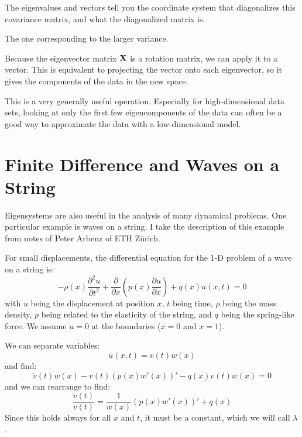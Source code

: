 
The eigenvalues and vectors tell you the coordinate system that
diagonalizes this covariance matrix, and what the diagonalized matrix
is.


\begin{answer}
The one corresponding to the larger variance.
\end{answer}

Because the eigenvector matrix ${\bf X}$ is a rotation matrix, we can
apply it to a vector.  This is equivalent to projecting the vector
onto each eigenvector, so it gives the components of the data in the
new space.

This is a very generally useful operation. Especially for
high-dimensional data sets, looking at only the first few
eigencomponents of the data can often be a good way to approximate the
data with a low-dimensional model.

\section{Finite Difference and Waves on a String}

Eigensystems are also useful in the analysis of many dynamical
problems. One particular example is waves on a string. I take the
description of this example from notes of Peter Arbenz of ETH
Z\"urich.

For small displacements, the differential equation for the 1-D problem
of a wave on a string is:
\begin{equation}
- \rho(x) \frac{\partial^2 u}{\partial t^2}
+ \frac{\partial }{\partial x}\left(p(x) \frac{\partial u}{\partial
  x}\right)
+ q(x) u(x, t) = 0
\end{equation}
with $u$ being the displacement at position $x$, $t$ being time,
$\rho$ being the mass density, $p$ being related to the elasticity of
the string, and $q$ being the spring-like force. We assume $u=0$ at
the boundaries ($x=0$ and $x=1$).

We can separate variables:
\begin{equation}
u(x, t) = v(t) w(x)
\end{equation}
and find:
\begin{equation}
\ddot{v}(t) w(x) - v(t) \left(p(x) w'(x)\right)' - q(x)v(t) w(x) = 0
\end{equation}
and we can rearrange to find:
\begin{equation}
\frac{\ddot{v}(t)}{v(t)} = \frac{1}{w(x)}\left(p(x) w'(x)\right)' + q(x)
\end{equation}
Since this holds always for all $x$ and $t$, it must be a constant,
which we will call $\lambda$. 

